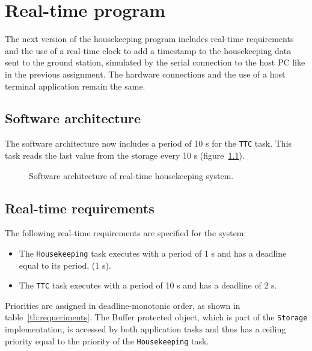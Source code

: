 \chapter{Real-time program}\label{ch:Assignment6}

The next version of the housekeeping program includes real-time requirements and the use of a real-time clock to add a timestamp to the housekeeping data sent to the ground station, simulated by the serial connection to the host PC like in the previous assignment. The hardware connections and the use of a host terminal application remain the same.

\section{Software architecture}

The software architecture now includes a period of 10 s for the {\tt TTC} task. This task reads the last value from the storage every 10 s (figure~\ref{fig:real-time}).

\begin{figure}[h]
            \caption{Software architecture of real-time housekeeping system.}
            \label{fig:real-time}
\end{figure}

\section{Real-time requirements}

The following real-time requirements are specified for the system:
\begin{itemize}
\item The {\tt Housekeeping} task executes with a period of 1 s and has a deadline equal to its period, (1 s).
\item The {\tt TTC} task executes with a period of 10 s and has a deadline of 2 s.
\end{itemize}

Priorities are assigned in deadline-monotonic order, as shown in table~\ref{tb:requeriments}. The Buffer protected object, which is part of the {\tt Storage} implementation, is accessed by both application tasks and thus has a ceiling priority equal to the priority of the {\tt Housekeeping} task.

